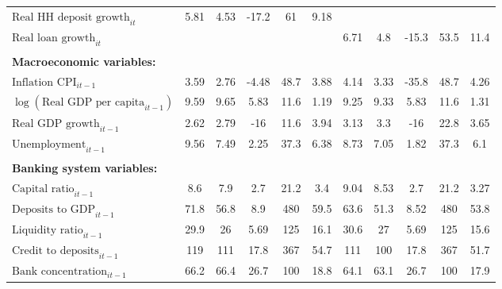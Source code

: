 {\begin{longtable}{l*{2}{|ccccc}}
$\text{Real HH deposit growth}_{it}$ &        5.81&        4.53&       -17.2&          61&        9.18&            &            &            &            &            \\
$\text{Real loan growth}_{it}$ &            &            &            &            &            &        6.71&         4.8&       -15.3&        53.5&        11.4\\
 & & & & & & & & & & \\
\textbf{Macroeconomic variables:} & & & & & & & & & & \\
$\text{Inflation CPI}_{it-1}$   &        3.59&        2.76&       -4.48&        48.7&        3.88&        4.14&        3.33&       -35.8&        48.7&        4.26\\
$\log(\text{Real GDP per capita}_{it-1})$ &        9.59&        9.65&        5.83&        11.6&        1.19&        9.25&        9.33&        5.83&        11.6&        1.31\\
$\text{Real GDP growth}_{it-1}$ &        2.62&        2.79&         -16&        11.6&        3.94&        3.13&         3.3&         -16&        22.8&        3.65\\
$\text{Unemployment}_{it-1}$    &        9.56&        7.49&        2.25&        37.3&        6.38&        8.73&        7.05&        1.82&        37.3&         6.1\\
 & & & & & & & & & & \\
\textbf{Banking system variables:} & & & & & & & & & & \\
$\text{Capital ratio}_{it-1}$   &         8.6&         7.9&         2.7&        21.2&         3.4&        9.04&        8.53&         2.7&        21.2&        3.27\\
$\text{Deposits to GDP}_{it-1}$ &        71.8&        56.8&         8.9&         480&        59.5&        63.6&        51.3&        8.52&         480&        53.8\\
$\text{Liquidity ratio}_{it-1}$  &        29.9&          26&        5.69&         125&        16.1&        30.6&          27&        5.69&         125&        15.6\\
$\text{Credit to deposits}_{it-1}$&         119&         111&        17.8&         367&        54.7&         111&         100&        17.8&         367&        51.7\\
$\text{Bank concentration}_{it-1}$   &        66.2&        66.4&        26.7&         100&        18.8&        64.1&        63.1&        26.7&         100&        17.9\\

\end{longtable}}
